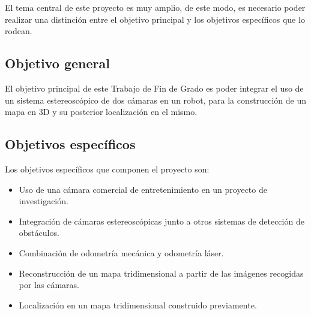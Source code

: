 

El tema central de este proyecto es muy amplio, de este modo, es necesario poder
realizar una distinción entre el objetivo principal y los objetivos específicos
que lo rodean.

\subsection{Objetivo general}
El objetivo principal de este Trabajo de Fin de Grado es poder integrar el uso
de un sistema estereoscópico de dos cámaras en un robot, para la construcción de
un mapa en 3D y su posterior localización en el mismo.

\subsection{Objetivos específicos}
Los objetivos específicos que componen el proyecto son:
\begin{itemize}
  \item Uso de una cámara comercial de entretenimiento en un proyecto de
  investigación.
  \item Integración de cámaras estereoscópicas junto a otros sistemas de
  detección de obstáculos.
  \item Combinación de odometría mecánica y odometría láser.
  \item Reconstrucción de un mapa tridimensional a partir de las imágenes
  recogidas por las cámaras.
  \item Localización en un mapa tridimensional construido previamente.
\end{itemize}

